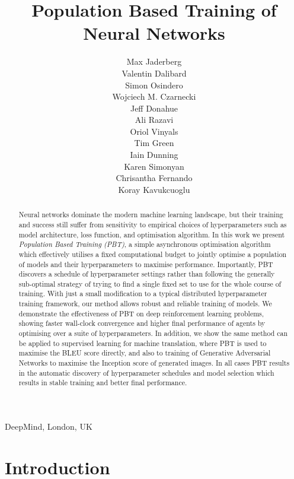 \documentclass{article} %
\title{Population Based Training of Neural Networks}
\author{
Max Jaderberg \\
\And
Valentin Dalibard \\
\And
Simon Osindero \\
\And
Wojciech M. Czarnecki \\
\AND
Jeff Donahue \\
\And
Ali Razavi \\
\And
Oriol Vinyals \\
\And
Tim Green \\
\And
Iain Dunning\\
\AND
Karen Simonyan \\
\And
Chrisantha Fernando \\
\And
Koray Kavukcuoglu
}
\begin{document}
\maketitle

\vspace{-3.0em}
 \begin{center}
 DeepMind, London, UK
 \end{center}
 \vspace{1em}



\begin{abstract}


Neural networks dominate the modern machine learning landscape, but their training and success still suffer from sensitivity to empirical choices of hyperparameters such as model architecture, loss function, and optimisation algorithm.
%
In this work we present \emph{Population Based Training (PBT)}, a simple asynchronous optimisation algorithm which effectively utilises a fixed computational budget to jointly optimise a population of models and their hyperparameters to maximise performance.
%
Importantly, PBT discovers a schedule of hyperparameter settings rather than following the generally sub-optimal strategy of trying to find a single fixed set to use for the whole course of training.
%
%
With just a small modification to a typical distributed hyperparameter training framework, our method allows robust and reliable training of models. 
%
We demonstrate the effectiveness of PBT on deep reinforcement learning problems, showing faster wall-clock convergence and higher final performance of agents by optimising over a suite of hyperparameters. 
%
In addition, we show the same method can be applied to supervised learning for machine translation, where PBT is used to maximise the BLEU score directly, and also to training of Generative Adversarial Networks to maximise the Inception score of generated images.
%
In all cases PBT results in the automatic discovery of hyperparameter schedules and model selection which results in stable training and better final performance.


\end{abstract}


\section{Introduction}
\end{document}

